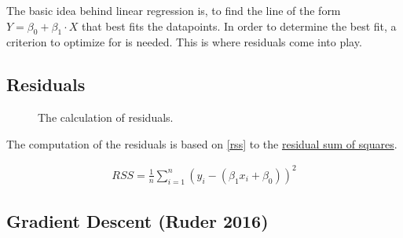 \documentclass[
  a4paper,
]{scrbook}
\begin{document}
The basic idea behind linear regression is, to find the line of the form
\(Y = \beta_0 + \beta_1 \cdot X\) that best fits the datapoints. In
order to determine the best fit, a criterion to optimize for is needed.
This is where residuals come into play.

\subsection{Residuals}\label{residuals}

\begin{figure}[H]


\caption{\label{fig-lm-error}The calculation of residuals.}

\end{figure}%

The computation of the residuals is based on \eqref{rss} to the
\hyperref[rss]{residual sum of squares}.

\begin{align}
RSS = \frac{1}{n} \sum_{i=1}^{n} (y_i - (\beta_1 x_i+\beta_0))^2 \label{rss}
\end{align}

\subsection{Gradient Descent (Ruder
2016)}\label{gradient-descent-ruder2016}
\end{document}
